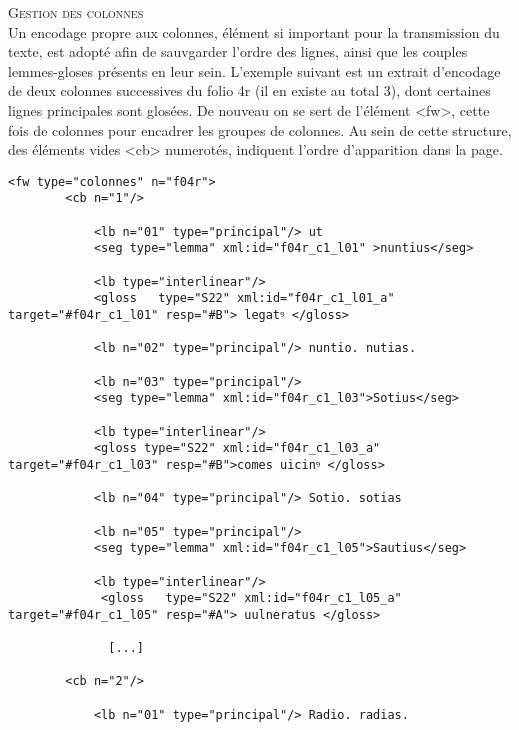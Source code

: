\documentclass[a4paper, twoside, 12pt]{book}
\begin{document}
\textsc{Gestion des colonnes}\\

Un encodage propre aux colonnes, élément si important pour la transmission du texte, est adopté afin de sauvgarder l'ordre des lignes, ainsi que les couples lemmes-gloses présents en leur sein. L'exemple suivant est un extrait d'encodage de deux colonnes successives  du folio 4r (il en existe au total 3), dont certaines lignes principales sont glosées. De nouveau on se sert de l'élément <fw>, cette fois de \@type \og{}colonnes\fg{} pour encadrer les groupes de colonnes. Au sein de cette structure, des éléments vides <cb> numerotés, indiquent l'ordre d'apparition dans la page. 

\begin{verbatim} 
<fw type="colonnes" n="f04r">
        <cb n="1"/>
                              
            <lb n="01" type="principal"/> ut 
            <seg type="lemma" xml:id="f04r_c1_l01" >nuntius</seg>
                              
            <lb type="interlinear"/>
            <gloss   type="S22" xml:id="f04r_c1_l01_a" target="#f04r_c1_l01" resp="#B"> legatꝰ </gloss> 
                              
            <lb n="02" type="principal"/> nuntio. nutias. 
               
            <lb n="03" type="principal"/> 
            <seg type="lemma" xml:id="f04r_c1_l03">Sotius</seg>
                              
            <lb type="interlinear"/>
            <gloss type="S22" xml:id="f04r_c1_l03_a" target="#f04r_c1_l03" resp="#B">comes uicinꝰ </gloss>
                              
            <lb n="04" type="principal"/> Sotio. sotias 
                              
            <lb n="05" type="principal"/>
            <seg type="lemma" xml:id="f04r_c1_l05">Sautius</seg>
                              
            <lb type="interlinear"/>
             <gloss   type="S22" xml:id="f04r_c1_l05_a" target="#f04r_c1_l05" resp="#Α"> uulneratus </gloss>
                              
              [...]
              
        <cb n="2"/>
        
            <lb n="01" type="principal"/> Radio. radias.
                                    

\end{verbatim}
\end{document}
